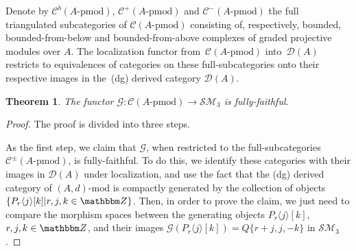 \documentclass[10pt,a4paper]{amsart}
\newtheorem{thm}{Theorem}[section]
\theoremstyle{definition}
\numberwithin{equation}{section}
\def\Z{{\mathbbm Z}}
\def\lra{{\longrightarrow}}
\def\dmod{{\mathrm{\mbox{-}mod}}} %
\def\pmod{{\mathrm{\mbox{-}pmod}}} %
\def\mc{\mathcal}
\begin{document}
Denote by $\mc{C}^b(A\pmod)$, $\mc{C}^+(A\pmod)$ and $\mc{C}^-(A\pmod)$ the full triangulated subcategories of $\mc{C}(A\pmod)$ consisting of, respectively, bounded, bounded-from-below and bounded-from-above complexes of graded projective modules over $A$. The localization functor from~$\mc{C}(A\pmod)$ into~$\mc{D}(A)$ restricts to equivalences of categories on these full-subcategories onto their respective images in the~(dg) derived category $\mc{D}(A)$.

\begin{thm}\label{thm-faithful-embedding}
The functor $\mc{G}\colon \mc{C}(A\pmod)\lra \mc{SM}_3$ is fully-faithful.
\end{thm}
\begin{proof}The proof is divided into three steps.

As the first step, we claim that $\mc{G}$, when restricted to the full-subcategories $\mc{C}^\pm(A\pmod)$, is fully-faithful. To do this, we identify these categories with their images in $\mc{D}(A)$ under localization, and use the fact that the (dg) derived category of $(A, d)\dmod$ is compactly generated by the collection of objects $\{P_r\langle j\rangle[k]|r,j,k\in \Z\}$. Then, in order to prove the claim, we just need to compare the morphism spaces between the generating objects $P_{r}\langle j \rangle[k]$, $r,j,k\in \Z$, and their images $\mc{G}(P_{r}\langle j \rangle[k])=Q\{r+j,j,-k\}$ in $\mc{SM}_3$ \cite[Lemma~4.2]{K}.


\end{proof}
\end{document}

